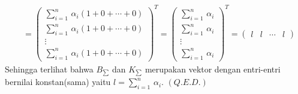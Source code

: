 \documentclass[11pt,a4paper]{article}
\newcommand{\ds}{\displaystyle}
\theoremstyle{plain}
\theoremstyle{definition}
\theoremstyle{remark}
\begin{document}
\begin{enumerate}
\begin{enumerate}
\begin{align*}
	&= \begin{pmatrix} 
	\ds \sum_{i=1}^{n}\,\alpha_{i}(1+0+\cdots+0)\\ 
	\ds \sum_{i=1}^{n}\,\alpha_{i}(1+0+\cdots+0)\\ 
	\vdots \\
	\ds \sum_{i=1}^{n}\,\alpha_{i}(1+0+\cdots+0)
	\end{pmatrix}^{T} 
	= \begin{pmatrix} 
	\ds \sum_{i=1}^{n}\,\alpha_{i}\\ 
	\ds \sum_{i=1}^{n}\,\alpha_{i}\\ 
	\vdots \\
	\ds \sum_{i=1}^{n}\,\alpha_{i}
	\end{pmatrix}^{T} 
	= \begin{pmatrix} 
	\ds l & 
	\ds l & 
	\cdots &
	\ds l
	\end{pmatrix}
	\end{align*}
	Sehingga terlihat bahwa $B_{\sum}$ dan $K_{\sum}$ merupakan vektor dengan entri-entri bernilai konstan(sama) yaitu $l=\ds \sum_{i=1}^{n}\, \alpha_{i}$. $(Q.E.D.)$
	


\end{enumerate}
\end{enumerate}
\end{document}
